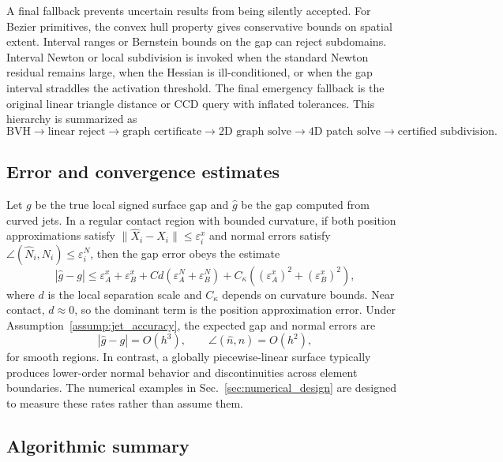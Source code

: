\documentclass[preprint,12pt]{elsarticle}
\newcommand{\eps}{\varepsilon}
\begin{document}
A final fallback prevents uncertain results from being silently accepted. For Bezier primitives, the convex hull property gives conservative bounds on spatial extent. Interval ranges or Bernstein bounds on the gap can reject subdomains. Interval Newton or local subdivision is invoked when the standard Newton residual remains large, when the Hessian is ill-conditioned, or when the gap interval straddles the activation threshold. The final emergency fallback is the original linear triangle distance or CCD query with inflated tolerances. This hierarchy is summarized as
\begin{equation}
    \text{BVH} \rightarrow
    \text{linear reject} \rightarrow
    \text{graph certificate} \rightarrow
    \text{2D graph solve} \rightarrow
    \text{4D patch solve} \rightarrow
    \text{certified subdivision}.
\end{equation}

\subsection{Error and convergence estimates}

Let $g$ be the true local signed surface gap and $\hat g$ be the gap computed from curved jets. In a regular contact region with bounded curvature, if both position approximations satisfy $\|\hat X_i-X_i\|\le \eps_i^x$ and normal errors satisfy $\angle(\hat N_i,N_i)\le \eps_i^N$, then the gap error obeys the estimate
\begin{equation}
    |\hat g-g|\le
    \eps_A^x+\eps_B^x
    + C d (\eps_A^N+\eps_B^N)
    + C_\kappa \left((\eps_A^x)^2+(\eps_B^x)^2\right),
    \label{eq:gap_error}
\end{equation}
where $d$ is the local separation scale and $C_\kappa$ depends on curvature bounds. Near contact, $d\approx 0$, so the dominant term is the position approximation error. Under Assumption~\ref{assump:jet_accuracy}, the expected gap and normal errors are
\begin{equation}
    |\hat g-g|=O(h^3),
    \qquad
    \angle(\hat n,n)=O(h^2),
    \label{eq:expected_convergence}
\end{equation}
for smooth regions. In contrast, a globally piecewise-linear surface typically produces lower-order normal behavior and discontinuities across element boundaries. The numerical examples in Sec.~\ref{sec:numerical_design} are designed to measure these rates rather than assume them.

\subsection{Algorithmic summary}
\end{document}
